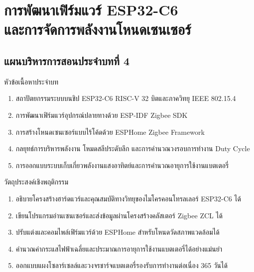\chapter[การพัฒนาเฟิร์มแวร์ ESP32-C6 และการจัดการพลังงานโหนดเซนเซอร์]{การพัฒนาเฟิร์มแวร์ ESP32-C6\\และการจัดการพลังงานโหนดเซนเซอร์}
\label{chap:ch04}

\section*{แผนบริหารการสอนประจำบทที่ 4}

\begin{planbox}{หัวข้อเนื้อหาประจำบท}
\begin{enumerate}[topsep=1pt, itemsep=0.5pt, partopsep=0pt, parsep=0pt, leftmargin=1.5em]
    \item สถาปัตยกรรมระบบบนชิป ESP32-C6 RISC-V 32 บิตและภาควิทยุ IEEE 802.15.4
    \item การพัฒนาเฟิร์มแวร์อุปกรณ์ปลายทางด้วย ESP-IDF Zigbee SDK
    \item การสร้างโหนดเซนเซอร์แบบไร้โค้ดด้วย ESPHome Zigbee Framework
    \item กลยุทธ์การบริหารพลังงาน โหมดสลีประดับลึก และการคำนวณวงรอบการทำงาน Duty Cycle
    \item การออกแบบระบบเก็บเกี่ยวพลังงานแสงอาทิตย์และการคำนวณอายุการใช้งานแบตเตอรี่
\end{enumerate}
\end{planbox}

\begin{planbox}{วัตถุประสงค์เชิงพฤติกรรม}
\begin{enumerate}[topsep=1pt, itemsep=0.5pt, partopsep=0pt, parsep=0pt, leftmargin=1.5em]
    \item อธิบายโครงสร้างฮาร์ดแวร์และคุณสมบัติทางวิทยุของไมโครคอนโทรลเลอร์ ESP32-C6 ได้
    \item เขียนโปรแกรมอ่านเซนเซอร์และส่งข้อมูลผ่านโครงสร้างคลัสเตอร์ Zigbee ZCL ได้
    \item ปรับแต่งและคอมไพล์เฟิร์มแวร์ด้วย ESPHome สำหรับโหนดวัดสภาพแวดล้อมได้
    \item คำนวณค่ากระแสไฟฟ้าเฉลี่ยและประมาณการอายุการใช้งานแบตเตอรี่ได้อย่างแม่นยำ
    \item ออกแบบแผงโซลาร์เซลล์และวงจรชาร์จแบตเตอรี่รองรับการทำงานต่อเนื่อง 365 วันได้
\end{enumerate}
\end{planbox}

